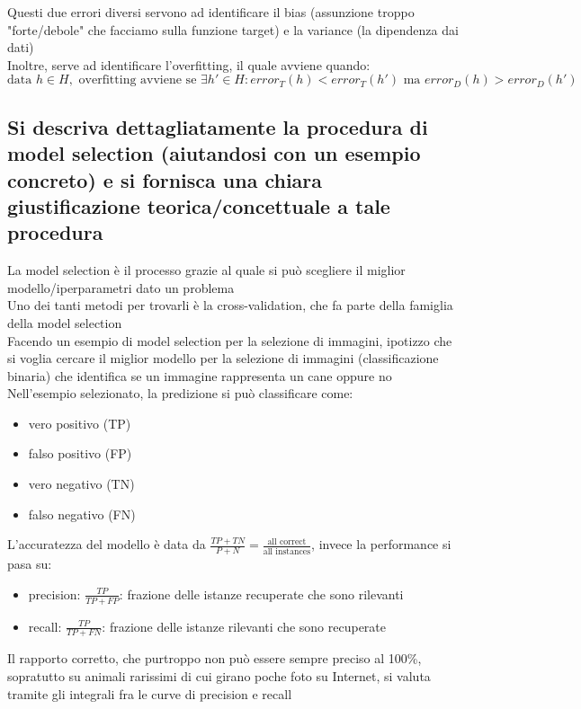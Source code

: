 \documentclass[10pt,oneside,a4paper]{article}
\begin{document}
	Questi due errori diversi servono ad identificare il bias (assunzione troppo "forte/debole" che facciamo sulla funzione target) e la variance (la dipendenza dai dati)\\
	Inoltre, serve ad identificare l'overfitting, il quale avviene quando:\\
	\[ \text{data } h \in H, \text{ overfitting avviene se } \exists h' \in H : error_T(h) < error_T(h') \text{ ma } error_D(h) > error_D (h') \]
	
	
	
	\subsection{Si descriva dettagliatamente la procedura di model selection (aiutandosi con un esempio
		concreto) e si fornisca una chiara giustificazione teorica/concettuale a tale procedura}
	La model selection è il processo grazie al quale si può scegliere il miglior modello/iperparametri dato un problema\\
	Uno dei tanti metodi per trovarli è la cross-validation, che fa parte della famiglia della model selection\\
	Facendo un esempio di model selection per la selezione di immagini, ipotizzo che si voglia cercare il miglior modello per la selezione di immagini (classificazione binaria) che identifica se un immagine rappresenta un cane oppure no\\
	Nell'esempio selezionato, la predizione si può classificare come:
	\begin{itemize}
		\item vero positivo (TP)
		\item falso positivo (FP)
		\item vero negativo (TN)
		\item falso negativo (FN)
	\end{itemize}
	L'accuratezza del modello è data da $\frac{TP+TN}{P+N} = \frac{\text{all correct}}{\text{all instances}}$, invece la performance si pasa su:
	\begin{itemize}
		\item precision: $\frac{TP}{TP+FP}$: frazione delle istanze recuperate che sono rilevanti
		\item recall: $\frac{TP}{TP+FN}$: frazione delle istanze rilevanti che sono recuperate
	\end{itemize}
	Il rapporto corretto, che purtroppo non può essere sempre preciso al 100\%, sopratutto su animali rarissimi di cui girano poche foto su Internet, si valuta tramite gli integrali fra le curve di precision e recall\\
\end{document}

